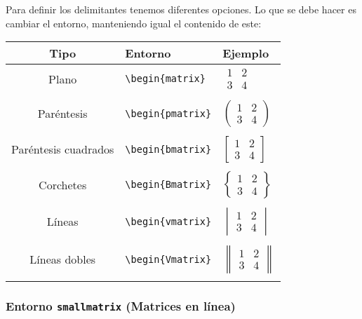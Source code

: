 Para definir los delimitantes tenemos diferentes opciones. Lo que se debe hacer es cambiar el entorno, manteniendo igual el contenido de este:

\begin{center}
	\begin{tabularx}{0.8\textwidth}{|c|X|X|}
		\hline
		Tipo & Entorno & Ejemplo\\
		\hline
		Plano & \verb|\begin{matrix}| & $\begin{matrix} 1 & 2\\3 & 4\end{matrix}$\\
		&&\\
		Paréntesis & \verb|\begin{pmatrix}| & $\begin{pmatrix} 1 & 2\\3 & 4\end{pmatrix}$\\
		&&\\
		Paréntesis cuadrados & \verb|\begin{bmatrix}| & $\begin{bmatrix} 1 & 2\\3 & 4\end{bmatrix}$\\
		&&\\
		Corchetes & \verb|\begin{Bmatrix}| & $\begin{Bmatrix} 1 & 2\\3 & 4\end{Bmatrix}$\\
		&&\\
		Líneas & \verb|\begin{vmatrix}| & $\begin{vmatrix} 1 & 2\\3 & 4\end{vmatrix}$\\
		&&\\
		Líneas dobles & \verb|\begin{Vmatrix}| & $\begin{Vmatrix} 1 & 2\\3 & 4\end{Vmatrix}$\\
		&&\\
		\hline
	\end{tabularx}
\end{center}

\subsubsection{Entorno \texttt{smallmatrix} (Matrices en línea)}

